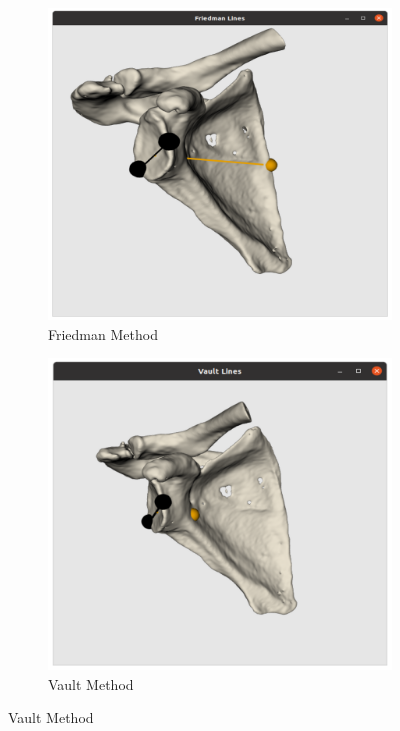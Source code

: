 \begin{figure}
\begin{center}
\begin{subfigure}[b]{0.30\linewidth}
			\includegraphics[width=\linewidth]{figures/friedman_vis.png}
			\caption{\label{fig:visfried}Friedman Method}
		\end{subfigure}	
                \begin{subfigure}[b]{0.30\linewidth}
			\includegraphics[width=\linewidth]{figures/vault_vis.png}
			\caption{\label{fig:visvault}Vault Method}
		\end{subfigure}	

\end{center}
\end{figure}
